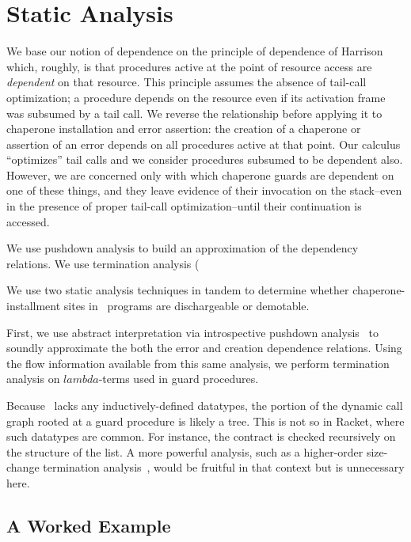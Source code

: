 \section{Static Analysis}

We base our notion of dependence on the principle of dependence of Harrison~\cite{harrison1989interprocedural} which, roughly, is that procedures active at the point of resource access are \emph{dependent} on that resource.
This principle assumes the absence of tail-call optimization; a procedure depends on the resource even if its activation frame was subsumed by a tail call.
We reverse the relationship before applying it to chaperone installation and error assertion: the creation of a chaperone or assertion of an error depends on all procedures active at that point.
Our calculus ``optimizes'' tail calls and we consider procedures subsumed to be dependent also.
However, we are concerned only with which chaperone guards are dependent on one of these things, and they leave evidence of their invocation on the stack--even in the presence of proper tail-call optimization--until their continuation is accessed.

We use pushdown analysis to build an approximation of the dependency relations.
We use termination analysis (

We use two static analysis techniques in tandem to determine whether chaperone-installment sites in \chapcalc\ programs are dischargeable or demotable.

First, we use abstract interpretation via introspective pushdown analysis~\cite{earl2012introspective} to soundly approximate the both the error and creation dependence relations.
Using the flow information available from this same analysis, we perform termination analysis on $lambda$-terms used in guard procedures.

Because \chapcalc\ lacks any inductively-defined datatypes, the portion of the dynamic call graph rooted at a guard procedure is likely a tree.
This is not so in Racket, where such datatypes are common.
For instance, the  contract is checked recursively on the structure of the list.
A more powerful analysis, such as a higher-order size-change termination analysis~\cite{sereni2007termination}, would be fruitful in that context but is unnecessary here.

\subsection{A Worked Example}

